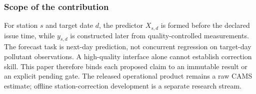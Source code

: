 \subsubsection{Scope of the contribution}
For station $s$ and target date $d$, the predictor $X_{s,d}$ is formed
before the declared issue time, while $y_{s,d}$ is constructed later from
quality-controlled measurements. The forecast task is next-day prediction,
not concurrent regression on target-day pollutant observations. A high-quality
interface alone cannot establish correction skill. This paper therefore
binds each proposed claim to an immutable result or an explicit pending gate.
The released operational product remains a raw CAMS estimate; offline
station-correction development is a separate research stream.
